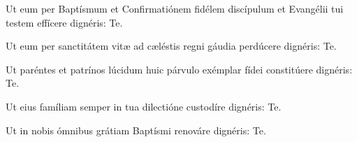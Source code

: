 Ut eum per Baptísmum et Confirmatiónem fidélem
discípulum et Evangélii tui testem effícere dignéris: \Rbardot{} Te.

 Ut eum per sanctitátem vitæ ad cæléstis regni gáudia
perdúcere dignéris: \Rbardot{} Te.

 Ut paréntes et patrínos lúcidum huic párvulo exémplar
fídei constitúere dignéris: \Rbardot{} Te.

 Ut eius famíliam semper in tua dilectióne custodíre
dignéris: \Rbardot{} Te.

 Ut in nobis ómnibus grátiam Baptísmi renováre dignéris: \Rbardot{} Te.

